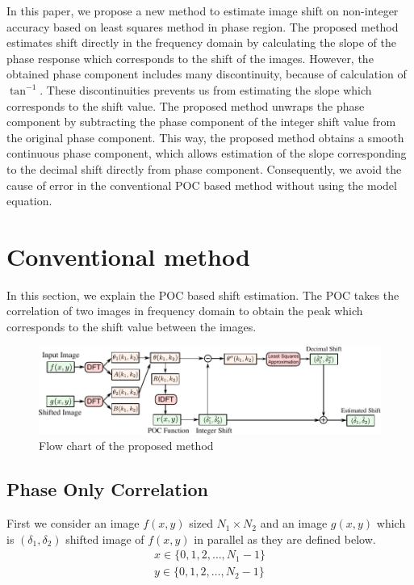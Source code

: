 \documentclass[a4paper,10pt,dvipdfmx,twocolumn,english]{jsarticle}
\begin{document}
In this paper, we propose a new method to estimate image shift on non-integer accuracy based on least squares method in phase region.
The proposed method estimates shift directly
    in the frequency domain by calculating the slope of the phase response which corresponds to the shift of the images.  
However, the obtained phase component includes many discontinuity, because of calculation of $\tan^{-1}$. 
These discontinuities prevents us from estimating the slope which corresponds to the shift value. 
The proposed method unwraps the phase component by subtracting the phase component of the integer shift value from the original phase component. 
This way, the proposed method obtains a smooth continuous phase component,
 which allows estimation of the slope corresponding to the decimal shift directly from phase component.
Consequently, we avoid the cause of error in the conventional POC based method without using the model equation.

\section{Conventional method}%
\label{sec:poc}%
In this section, we explain the POC based shift estimation. 
The POC takes the correlation of two images in frequency domain
   to obtain the peak which corresponds to the shift value between the images.
%
\begin{figure}[t]
   \centering
   \includegraphics[width=.95\hsize]{figure/flowchart.pdf}
   \caption{Flow chart of the proposed method}
   \label{flowchart}
\end{figure}

\subsection{Phase Only Correlation}

First we consider an image $f(x,y)$ sized $N_1 \times N_2$ and an image $g(x,y)$ 
   which is $(\delta_1,\delta_2)$ shifted image of $f(x,y)$ in parallel as they are defined below.
   \begin{align}
      x \in \{0, 1, 2,\ldots,N_1-1\} \\
      y \in \{0, 1, 2,\ldots,N_2-1\}
   \end{align}
\end{document}
